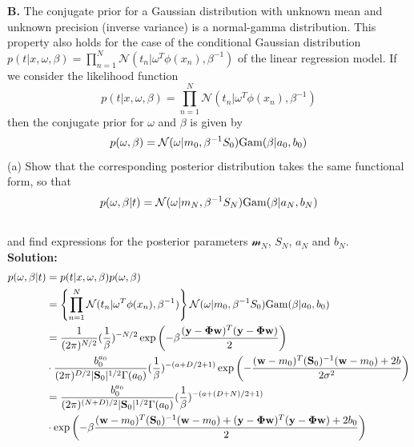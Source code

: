 \documentclass{article}
\begin{document}
\textbf{B.} The conjugate prior for a Gaussian distribution with unknown mean and unknown precision (inverse variance) is a normal-gamma distribution. This property also holds for the case of the conditional Gaussian distribution $p(t|x,\omega,\beta) = \prod^{N}_{n=1} \mathcal{N}(t_{n}|\omega^{T}\phi(x_{n}),\beta^{-1})$ of the linear regression model. If we consider the likelihood function
\begin{equation}
    p(t|x,\omega,\beta) = \prod^{N}_{n=1} \mathcal{N}(t_{n}|\omega^{T}\phi(x_{n}),\beta^{-1})
\end{equation}
then the conjugate prior for $\omega$ and $\beta$ is given by
\begin{equation}
    p(\omega, \beta) = \mathcal{N}(\omega|m_{0}, \beta^{-1}S_{0}) {\rm Gam} (\beta|a_{0},b_{0})
\end{equation}
(a) Show that the corresponding posterior distribution takes the same functional form, so that
\begin{equation}
    p(\omega, \beta | t) = \mathcal{N}(\omega|m_{N}, \beta^{-1}S_{N}) {\rm Gam} (\beta|a_{N},b_{N})
\end{equation} \\
and find expressions for the posterior parameters $\mathcal{m}_{N}$, $S_{N}$, $a_N$ and $b_{N}$.
\\
\textbf{Solution:} \\
\begin{equation}
\begin{aligned}
    p(\omega, \beta | t) & = p(t|x,\omega,\beta)  p(\omega, \beta)  \\
    & = \left\{\prod^{N}_{n=1} \mathcal{N}(t_{n}|\omega^{T}\phi(x_{n}),\beta^{-1}) \right\} \mathcal{N}(\omega|m_{0}, \beta^{-1}S_{0}) {\rm Gam} (\beta|a_{0},b_{0}) \\
    & = \frac{1}{(2\pi)^{N/2}} (\frac{1}{\beta})^{-N/2} \exp \left(-\beta \frac{(\mathbf{y- \Phi w})^{T}(\mathbf{y-\Phi w})}{2} \right)   \\
    & \cdot \frac{b_0^{a_{0}}}{(2\pi)^{D/2}|\mathbf{S}_{0}|^{1/2} \Gamma(a_0)}(\frac{1}{\beta})^{-(a+D/2+1)} \exp \left( -\frac{(\mathbf{w}-m_{0})^{T}(\mathbf{S}_{0})^{-1} (\mathbf{w}-m_{0})+2b}{2\sigma^2}\right) \\
   & = \frac{b_0^{a_{0}}}{(2\pi)^{(N+D)/2}|\mathbf{S}_{0}|^{1/2} \Gamma(a_0)}(\frac{1}{\beta})^{-(a+(D+N)/2+1)}  \\ & \cdot \exp \left( -\beta \frac{(\mathbf{w}-m_{0})^{T}(\mathbf{S}_{0})^{-1} (\mathbf{w}-m_{0})+(\mathbf{y- \Phi w})^{T}(\mathbf{y-\Phi w})+2b_0}{2}\right)
\end{aligned}
\end{equation}
\end{document}
